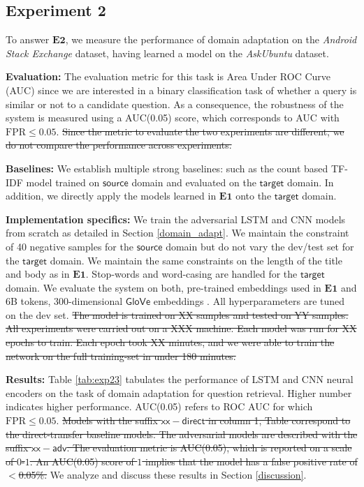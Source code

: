 \documentclass{sigkddExp}
\begin{document}
\subsection{Experiment 2} 
To answer $\mathbf{E2}$, we measure the performance of domain adaptation on the \textit{Android Stack Exchange} dataset, having learned a model on the \textit{AskUbuntu} dataset.

\textbf{Evaluation:} The evaluation metric for this task is {\color{red} Area Under ROC Curve (AUC) since we are interested in a binary classification task of whether a query is similar or not to a candidate question. As a consequence, the robustness of the system is measured using a AUC(0.05) score, which corresponds to AUC with $\mathrm{FPR} \leq 0.05$. \st{Since the metric to evaluate the two experiments are different, we do not compare the performance across experiments.}}

\textbf{Baselines:} {\color{red} We establish multiple strong baselines: such as the count based TF-IDF model trained on $\textsf{source}$ domain and evaluated on the $\textsf{target}$ domain. In addition, we directly apply the models learned in $\mathbf{E1}$ onto the $\textsf{target}$ domain.}

\textbf{Implementation specifics:} {\color{red} We train the adversarial LSTM and CNN models from scratch as detailed in Section \ref{domain_adapt}. We maintain the constraint of 40 negative samples for the $\mathsf{source}$ domain but do not vary the dev/test set for the $\mathsf{target}$ domain.} We maintain the same constraints on the length of the title and body as in $\mathbf{E1}$. Stop-words and word-casing are handled for the $\mathsf{target}$ domain. We evaluate the system on both, pre-trained embeddings used in $\mathbf{E1}$ and {\color{red} 6B tokens, 300-dimensional}  $\mathsf{GloVe}$ embeddings \cite{pennington2014glove}. All hyperparameters are tuned on the dev set. {\color{red} \st{The model is trained on XX samples and tested on YY samples. All experiments were carried out on a XXX machine. Each model was run for XX epochs to train. Each epoch took XX minutes, and we were able to train the network on the full training-set in under 180 minutes.}}

\textbf{Results:} Table \ref{tab:exp23} tabulates the performance of LSTM and CNN neural encoders on the task of domain adaptation for question retrieval. {\color{red} Higher number indicates higher performance. AUC(0.05) refers to ROC AUC for which $\mathrm{FPR} \leq 0.05$. \st{Models with the suffix $\mathsf{xx-direct}$ in column 1, Table correspond to the direct-transfer baseline models. The adversarial models are described with the suffix $\mathsf{xx-adv}$. The evaluation metric is AUC(0.05), which is reported on a scale of $0$-$1$. An AUC(0.05) score of $1$ implies that the model has a false positive rate of $<$0.05\%.}} We analyze and discuss these results in Section \ref{discussion}.
\end{document}

